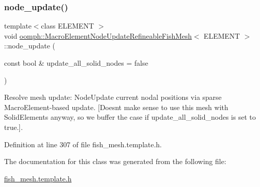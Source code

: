 \subsubsection{\texorpdfstring{node\+\_\+update()}{node\_update()}}
{\footnotesize\ttfamily template$<$class E\+L\+E\+M\+E\+NT $>$ \\
void \hyperlink{classoomph_1_1MacroElementNodeUpdateRefineableFishMesh}{oomph\+::\+Macro\+Element\+Node\+Update\+Refineable\+Fish\+Mesh}$<$ E\+L\+E\+M\+E\+NT $>$\+::node\+\_\+update (\begin{DoxyParamCaption}\item[{const bool \&}]{update\+\_\+all\+\_\+solid\+\_\+nodes = {\ttfamily false} }\end{DoxyParamCaption})\hspace{0.3cm}{\ttfamily [inline]}}



Resolve mesh update\+: Node\+Update current nodal positions via sparse Macro\+Element-\/based update. \mbox{[}Doesn\textquotesingle{}t make sense to use this mesh with Solid\+Elements anyway, so we buffer the case if update\+\_\+all\+\_\+solid\+\_\+nodes is set to true.\mbox{]}. 



Definition at line 307 of file fish\+\_\+mesh.\+template.\+h.



The documentation for this class was generated from the following file\+:\begin{DoxyCompactItemize}
\item 
\hyperlink{fish__mesh_8template_8h}{fish\+\_\+mesh.\+template.\+h}\end{DoxyCompactItemize}
